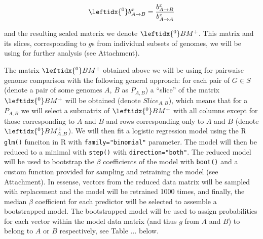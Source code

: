 \documentclass{article}
\begin{document}
\begin{equation}
\leftidx{^0}b_{A \rightarrow B}^x = \dfrac{b_{A \rightarrow B}^x}{b_{A \rightarrow
A}^x} 
\end{equation}

\newcommand{\bmzp}{\leftidx{^0}BM^+}

and the resulting scaled materix we denote $\leftidx{^0}BM^+$. This matrix and
its slices, corresponding to $g$s from individual subsets of genomes, we will
be using for further analysis (see Attachment).

The matrix $\bmzp{}$ obtained above we will be using for pairwaise genome
comparison with the following general approach:
for each pair of $G \in S$ (denote a pair of some genomes $A$, $B$ as
$P_{A,B}$) a ``slice'' of the matrix $\bmzp{}$
will be obtained (denote $Slice_{A,B}$), which means that for a $P_{A,B}$ we
will select a submatrix of $\bmzp{}$ with all columns except for those
corresponding to $A$ and $B$ and rows corresponding only to $A$ and $B$ (denote
$\leftidx{^0}BM_{A,B}^+$).
\newcommand{\bmzpab}{\leftidx{^0}BM_{A,B}^+}
We will then fit a logistic regression model using the R {\tt glm()} funciton
in R with {\tt family="binomial"} parameter. The model will then be reduced to
a minimal with {\tt step()} with {\tt direction="both"}. The reduced model will
be used to bootstrap the $\beta$ coefficients of the model with {\tt boot()} and
a custom function provided for sampling and retraining the model (see
Attachment). In essense, vectors from the reduced data matrix will be
sampled with replacement and the model will be retrained 1000 times, and
finally, the median $\beta$ coefficient for each predictor will be selected to
assemble a bootstrapped model. The bootstrapped model will be used to assign
probabilities for each vector within the model data matrix (and thus $g$ from
$A$ and $B$) to belong to $A$ or $B$ respectively, see Table ... below.
\end{document}
